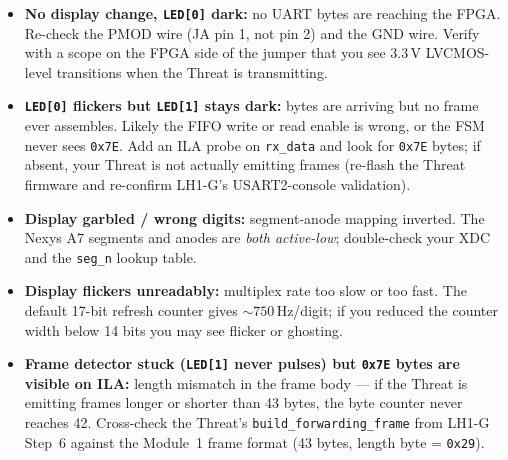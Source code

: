 \documentclass[11pt,letterpaper]{article}
\begin{document}
\begin{tcolorbox}[warning={Troubleshooting}]
	\begin{itemize}[leftmargin=1.2em]
		\item \textbf{No display change, \texttt{LED[0]} dark:} no UART bytes are reaching the FPGA. Re-check the PMOD wire (JA pin 1, not pin 2) and the GND wire. Verify with a scope on the FPGA side of the jumper that you see 3.3\,V LVCMOS-level transitions when the Threat is transmitting.
		\item \textbf{\texttt{LED[0]} flickers but \texttt{LED[1]} stays dark:} bytes are arriving but no frame ever assembles. Likely the FIFO write or read enable is wrong, or the FSM never sees \texttt{0x7E}. Add an ILA probe on \texttt{rx\_data} and look for \texttt{0x7E} bytes; if absent, your Threat is not actually emitting frames (re-flash the Threat firmware and re-confirm LH1-G's USART2-console validation).
		\item \textbf{Display garbled / wrong digits:} segment-anode mapping inverted. The Nexys A7 segments and anodes are \emph{both active-low}; double-check your XDC and the \texttt{seg\_n} lookup table.
		\item \textbf{Display flickers unreadably:} multiplex rate too slow or too fast. The default 17-bit refresh counter gives ${\sim}750$\,Hz/digit; if you reduced the counter width below 14 bits you may see flicker or ghosting.
		\item \textbf{Frame detector stuck (\texttt{LED[1]} never pulses) but \texttt{0x7E} bytes are visible on ILA:} length mismatch in the frame body --- if the Threat is emitting frames longer or shorter than 43 bytes, the byte counter never reaches 42. Cross-check the Threat's \texttt{build\_forwarding\_frame} from LH1-G Step~6 against the Module~1 frame format (43 bytes, length byte = \texttt{0x29}).
	\end{itemize}
\end{tcolorbox}
\end{document}
